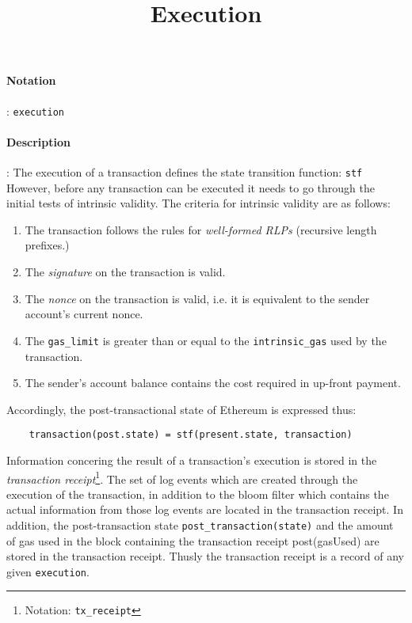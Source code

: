 \documentclass[10pt,a4paper,oneside]{scrartcl}
\author{}
\title{Execution}
\date{}
\begin{document}
\maketitle
\paragraph{Notation}: \texttt{execution}
\paragraph{Description}: The execution of a transaction defines the state transition function: \texttt{stf} However, before any transaction can be executed it needs to go through the initial tests of intrinsic validity. The criteria for intrinsic validity are as follows:

	\begin{enumerate}
		\item The transaction follows the rules for \textsl{well-formed RLPs} (recursive length prefixes.)
		\item The \textsl{signature} on the transaction is valid.
		\item The \textsl{nonce} on the transaction is valid, i.e. it is equivalent to the sender account's current nonce.
		\item The \texttt{gas\_limit} is greater than or equal to the \texttt{intrinsic\_gas} used by the transaction.
		\item The sender's account balance contains the cost required in up-front payment.
	\end{enumerate}

Accordingly, the post-transactional state of Ethereum is expressed thus: 

	\begin{lstlisting}
	transaction(post.state) = stf(present.state, transaction)  
	\end{lstlisting}

Information concering the result of a transaction's execution is stored in the \textit{transaction receipt}\footnote{Notation: \texttt{tx\_receipt}}.
The set of log events which are created through the execution of the transaction, in addition to the bloom filter which contains the actual information from those log events are located in the transaction receipt. In addition, the post-transaction state \texttt{post\_transaction(state)} and the amount of gas used in the block containing the transaction receipt post(gasUsed) are stored in the transaction receipt. Thusly the transaction receipt is a record of any given \texttt{execution}. \par
\end{document}
